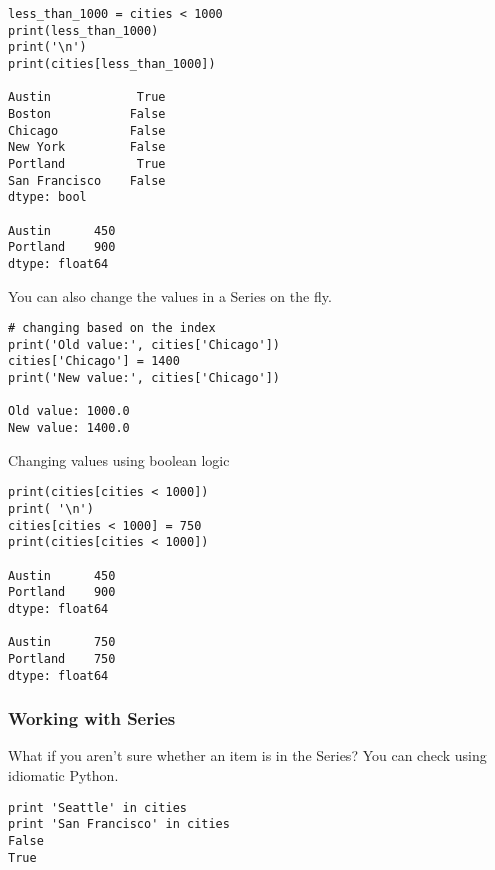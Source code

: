 
\begin{frame}[fragile]
\begin{lstlisting}
less_than_1000 = cities < 1000
print(less_than_1000)
print('\n')
print(cities[less_than_1000])

Austin            True
Boston           False
Chicago          False
New York         False
Portland          True
San Francisco    False
dtype: bool

Austin      450
Portland    900
dtype: float64
\end{lstlisting}
\end{frame}

\begin{frame}[fragile]
You can also change the values in a Series on the fly.
\begin{lstlisting}
# changing based on the index
print('Old value:', cities['Chicago'])
cities['Chicago'] = 1400
print('New value:', cities['Chicago'])

Old value: 1000.0
New value: 1400.0
\end{lstlisting}
\end{frame}

\begin{frame}[fragile]	
Changing values using boolean logic
\begin{lstlisting}
print(cities[cities < 1000])
print( '\n')
cities[cities < 1000] = 750
print(cities[cities < 1000])

Austin      450
Portland    900
dtype: float64

Austin      750
Portland    750
dtype: float64
\end{lstlisting}
\end{frame}

\begin{frame}[fragile]\frametitle{Working with Series}
What if you aren't sure whether an item is in the Series? You can check using idiomatic Python.
\begin{lstlisting}
print 'Seattle' in cities
print 'San Francisco' in cities
False
True
\end{lstlisting}
\end{frame}

